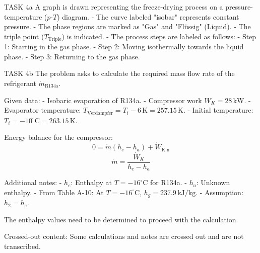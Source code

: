 TASK 4a  
A graph is drawn representing the freeze-drying process on a pressure-temperature (\(p\)-\(T\)) diagram.  
- The curve labeled "isobar" represents constant pressure.  
- The phase regions are marked as "Gas" and "Flüssig" (Liquid).  
- The triple point (\(T_{\text{Triple}}\)) is indicated.  
- The process steps are labeled as follows:  
  - Step 1: Starting in the gas phase.  
  - Step 2: Moving isothermally towards the liquid phase.  
  - Step 3: Returning to the gas phase.  

TASK 4b  
The problem asks to calculate the required mass flow rate of the refrigerant \( \dot{m}_{\text{R134a}} \).  

Given data:  
- Isobaric evaporation of R134a.  
- Compressor work \( W_K = 28 \, \text{kW} \).  
- Evaporator temperature: \( T_{\text{Verdampfer}} = T_i - 6 \, \text{K} = 257.15 \, \text{K} \).  
- Initial temperature: \( T_i = -10^\circ\text{C} = 263.15 \, \text{K} \).  

Energy balance for the compressor:  
\[
0 = \dot{m} (h_e - h_a) + \dot{W}_{\text{K,n}}
\]  
\[
\dot{m} = \frac{\dot{W}_K}{h_e - h_a}
\]  

Additional notes:  
- \( h_e \): Enthalpy at \( T = -16^\circ\text{C} \) for R134a.  
- \( h_a \): Unknown enthalpy.  
- From Table A-10: At \( T = -16^\circ\text{C} \), \( h_g = 237.9 \, \text{kJ/kg} \).  
- Assumption: \( h_2 = h_e \).  

The enthalpy values need to be determined to proceed with the calculation.  

Crossed-out content:  
Some calculations and notes are crossed out and are not transcribed.